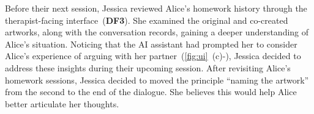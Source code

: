 Before their next session, Jessica reviewed Alice's homework history through the therapist-facing interface~(\textbf{DF3}). She examined the original and co-created artworks, along with the conversation records, gaining a deeper understanding of Alice's situation. Noticing that the AI assistant had prompted her to consider Alice's experience of arguing with her partner~(\autoref{fig:ui}~(c)-), Jessica decided to address these insights during their upcoming session. After revisiting Alice's homework sessions, Jessica decided to moved the principle ``naming the artwork'' from the second to the end of the dialogue. She believes this would help Alice better articulate her thoughts.








